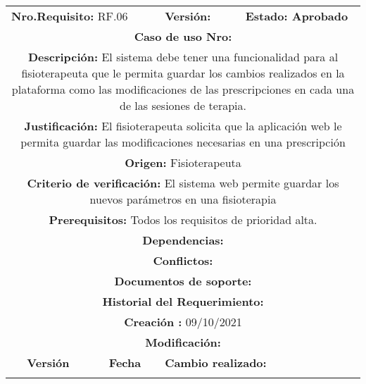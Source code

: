 \begin{center}
        
        
        
        
        
        
\begin{tabular}{|c|c|p{4cm}|p{4cm}|}
            \hline
            \rowcolor{red} \multicolumn{4}{|c|}{\textbf{Prioridad:} Alta}  \\
            \hline
            \multicolumn{2}{|l}{\textbf{Nro.Requisito: }RF.06} & \multicolumn{1}{|l}{\textbf{Versión:}} & \multicolumn{1}{|l|}{\textbf{Estado: Aprobado}} \\
            \multicolumn{4}{|p{13cm}|}{\textbf{Caso de uso Nro: }}  \\
            \hline
            \multicolumn{4}{|p{13cm}|}{\textbf{Descripción: } El sistema debe tener una funcionalidad para al fisioterapeuta que le permita guardar los cambios realizados en la plataforma como las modificaciones de las prescripciones en cada una de las sesiones de terapia. } \\
            \multicolumn{4}{|p{13cm}|}{\textbf{Justificación: } El fisioterapeuta solicita que la aplicación web le permita guardar las modificaciones necesarias en una prescripción } \\ 
            \multicolumn{4}{|p{13cm}|}{\textbf{Origen: }Fisioterapeuta}  \\
            \multicolumn{4}{|p{13cm}|}{\textbf{Criterio de verificación: } El sistema web permite guardar los nuevos parámetros en una fisioterapia  } \\
            \hline
            \multicolumn{4}{|p{13cm}|}{\textbf{Prerequisitos: } Todos los requisitos de prioridad alta. }\\
            \hline \multicolumn{4}{|p{12cm}|}{\textbf{Dependencias: }
                }  \\
            \multicolumn{4}{|p{12cm}|}{\textbf{Conflictos: }}  \\
            \hline
            \multicolumn{4}{|p{12cm}|}{\textbf{Documentos de soporte: }}  \\
            \hline
            \multicolumn{4}{|p{12cm}|}{\textbf{Historial del Requerimiento: }}  \\
            \multicolumn{4}{|p{12cm}|}{\textbf{Creación : }09/10/2021}  \\
            \multicolumn{4}{|p{12cm}|}{\textbf{Modificación: }}  \\
             \textbf{Versión} & \textbf{Fecha} & \multicolumn{2}{p{8cm}|}{\textbf{Cambio realizado:}} \\
            \hline
               & &   \multicolumn{2}{p{8cm}|}{}
              \\
            \hline
\end{tabular}        
        



\end{center}
